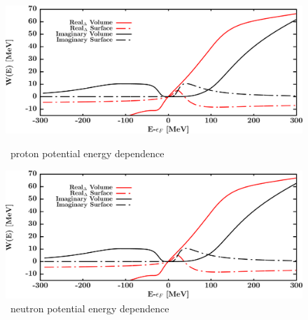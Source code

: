 \begin{figure}[hbtp]
    \centering
    \begin{minipage}{0.42\textwidth}
        \centering
        \includegraphics[width=\textwidth]{figures/o16_protonPotentials.png}
        \caption*{\footnotesize\oSix\ proton potential energy dependence}
        \label{DOMFitData_o16_proton_potentialComponent_energy}
    \end{minipage}\hspace{6pt}
    \begin{minipage}{0.42\textwidth}
        \centering
        \includegraphics[width=\textwidth]{figures/o16_neutronPotentials.png}
        \caption*{\footnotesize\oSix\ neutron potential energy dependence}
        \label{DOMFitData_o16_neutron_potentialComponent_energy}
    \end{minipage}
\end{figure}
